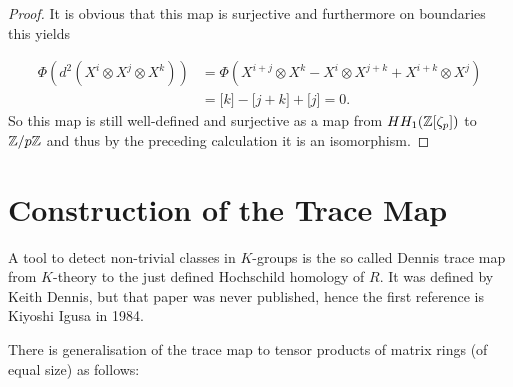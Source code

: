 {\begin{proof}
It is obvious that this map is surjective and furthermore on boundaries this yields

$$\begin{aligned}
\Phi(d^2(X^i\otimes X^j \otimes X^k))&=\Phi(X^{i+j}\otimes X^k-X^{i}\otimes X^{j+k} + X^{i+k}\otimes X^j) \\
 &= \lbrack k \rbrack - \lbrack j+k\rbrack +\lbrack j \rbrack=0.
  \end{aligned}
$$
So this map is still well-defined and surjective as a map from $HH_1(\mathbb{Z}\lbrack \zeta_p\rbrack)$ to $\mathbb{Z}/p\mathbb{Z}$ and
thus by the preceding calculation it is an isomorphism.
\end{proof}}

\section{Construction of the Trace Map}
A tool to detect non-trivial classes in $K$-groups is the so called Dennis trace map from $K$-theory to the just defined Hochschild homology of $R$.
It was defined by Keith Dennis, but that paper was never published, hence the first reference is Kiyoshi Igusa \cite{IgusaWhat} in 1984.


There is generalisation of the trace map to tensor products of matrix rings (of equal size) as follows:



